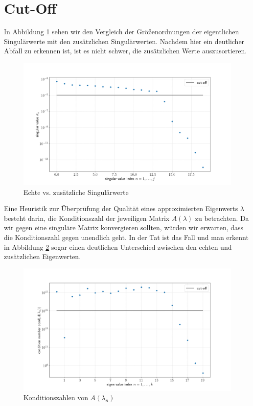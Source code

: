 \section{Cut-Off}

In Abbildung \ref{fig:plot2} sehen wir den Vergleich der Größenordnungen der eigentlichen Singulärwerte mit den zusätzlichen Singulärwerten.
Nachdem hier ein deutlicher Abfall zu erkennen ist, ist es nicht schwer, die zusätzlichen Werte auszusortieren.

\begin{figure}[H]
  \includegraphics[width = \linewidth]{Plots/singulaerwerte_plot.png}
  \caption{Echte vs. zusätzliche Singulärwerte}
  \label{fig:plot2}
\end{figure}

Eine Heuristik zur Überprüfung der Qualität eines approximierten Eigenwerts $\lambda$ besteht darin, die Konditionszahl der jeweiligen Matrix $A(\lambda)$ zu betrachten.
Da wir gegen eine singuläre Matrix konvergieren sollten, würden wir erwarten, dass die Konditionszahl gegen unendlich geht.
In der Tat ist das Fall und man erkennt in Abbildung \ref{fig:plot3} sogar einen deutlichen Unterschied zwischen den echten und zusätzlichen Eigenwerten.

\begin{figure}[H]
  \includegraphics[width = \linewidth]{Plots/conditionnumber.png}
  \caption{Konditionszahlen von $A(\lambda_n)$}
  \label{fig:plot3}
\end{figure}
